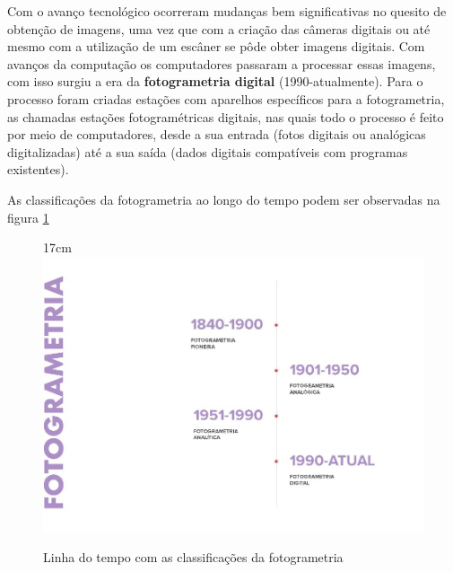 Com o avanço tecnológico ocorreram mudanças bem significativas no quesito de obtenção de imagens, uma vez que com a criação das câmeras digitais ou até mesmo com a utilização de um escâner se pôde obter imagens digitais. Com avanços da computação os computadores passaram a processar essas imagens, com isso surgiu a era da \textbf{fotogrametria digital} (1990-atualmente). Para o processo foram criadas estações com aparelhos específicos para a fotogrametria, as chamadas estações fotogramétricas digitais, nas quais todo o processo é feito por meio de computadores, desde a sua entrada (fotos digitais ou analógicas digitalizadas) até a sua saída (dados digitais compatíveis com programas existentes).

As classificações da fotogrametria ao longo do tempo podem ser observadas na figura \ref{fig:linha_do_tempo}

\begin{figure}[!ht]{17cm}
	\centering
	\includegraphics[width=12cm]{Figuras/linha_do_tempo.jpg}
	\caption{Linha do tempo com as classificações da fotogrametria} \label{fig:linha_do_tempo}
\end{figure}


